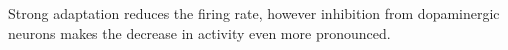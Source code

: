 Strong adaptation reduces the firing rate, however inhibition from dopaminergic neurons makes the decrease in activity even more pronounced. 
  
  